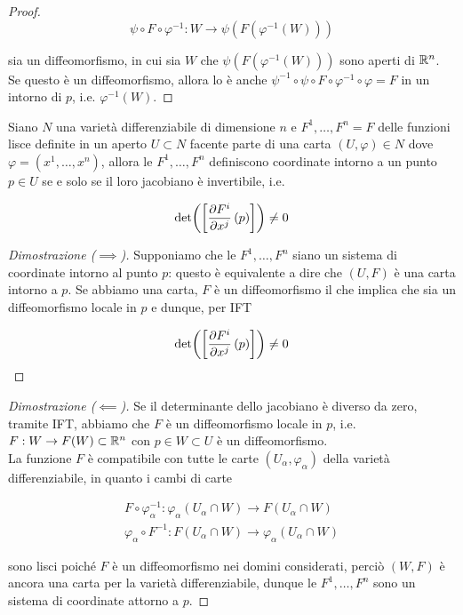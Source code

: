 \begin{proof}
	\begin{equation}
		\psi \circ F \circ \varphi^{-1} : W \to \psi(F(\varphi^{-1}(W)))
	\end{equation}

	sia un diffeomorfismo, in cui sia $ W $ che $ \psi(F(\varphi^{-1}(W))) $ sono aperti di $ \mathbb{R}^{n} $. Se questo è un diffeomorfismo, allora lo è anche $ \psi^{-1} \circ \psi \circ F \circ \varphi^{-1} \circ \varphi = F $ in un intorno di $ p $, i.e. $ \varphi^{-1}(W) $.
\end{proof}

\begin{corollary}[IFT]\label{cor:ift}
	Siano $ N $ una varietà differenziabile di dimensione $ n $ e $ F^{1},\dots,F^{n} = F $ delle funzioni lisce definite in un aperto $ U \subset N $ facente parte di una carta $ (U,\varphi) \in N $ dove $ \varphi = (x^{1},\dots,x^{n}) $, allora le $ F^{1},\dots,F^{n} $ definiscono coordinate intorno a un punto $ p \in U $ se e solo se il loro jacobiano è invertibile, i.e.
	
	\begin{equation}
		\det( \left[ \pdv{F^{i}}{x^{j}} \, (p) \right] ) \neq 0
	\end{equation}
\end{corollary}

\begin{proof}[Dimostrazione ($ \implies $)]
	Supponiamo che le $ F^{1},\dots,F^{n} $ siano un sistema di coordinate intorno al punto $ p $: questo è equivalente a dire che $ (U,F) $ è una carta intorno a $ p $. Se abbiamo una carta, $ F $ è un diffeomorfismo il che implica che sia un diffeomorfismo locale in $ p $ e dunque, per IFT
	
	\begin{equation}
		\det( \left[ \pdv{F^{i}}{x^{j}} \, (p) \right] ) \neq 0
	\end{equation}
\end{proof}

\begin{proof}[Dimostrazione ($ \impliedby $)]
	Se il determinante dello jacobiano è diverso da zero, tramite IFT, abbiamo che $ F $ è un diffeomorfismo locale in $ p $, i.e. $ F : W \to F(W) \subset \mathbb{R}^{n} $ con $ p \in W \subset U $ è un diffeomorfismo. \\
	La funzione $ F $ è compatibile con tutte le carte $ (U_{\alpha},\varphi_{\alpha}) $ della varietà differenziabile, in quanto i cambi di carte
				
	\begin{gather}
			F \circ \varphi_{\alpha}^{-1} : \varphi_{\alpha}(U_{\alpha} \cap W) \to F(U_{\alpha} \cap W) \\
			\varphi_{\alpha} \circ F^{-1} : F(U_{\alpha} \cap W) \to \varphi_{\alpha}(U_{\alpha} \cap W)
	\end{gather}
			
	sono lisci poiché $ F $ è un diffeomorfismo nei domini considerati, perciò $ (W,F) $ è ancora una carta per la varietà differenziabile, dunque le $ F^{1},\dots,F^{n} $ sono un sistema di coordinate attorno a $ p $.
\end{proof}

